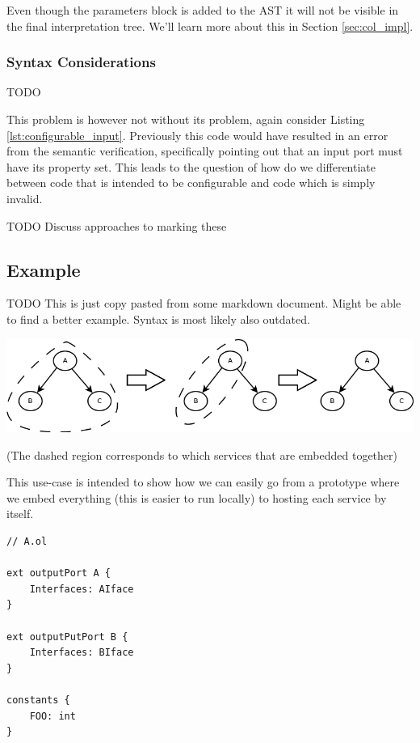 Even though the parameters block is added to the AST it will not be visible in
the final interpretation tree. We'll learn more about this in Section
\ref{sec:col_impl}.

\subsubsection*{Syntax Considerations}

TODO

This problem is however not without its problem, again consider Listing
\ref{lst:configurable_input}. Previously this code would have resulted in an
error from the semantic verification, specifically pointing out that an input
port must have its  property set. This leads to the question
of how do we differentiate between code that is intended to be configurable and
code which is simply invalid.

TODO Discuss approaches to marking these

\subsection{Example}

TODO This is just copy pasted from some markdown document. Might be able to
find a better example. Syntax is most likely also outdated.

\includegraphics[width=\textwidth]{prototypes.png}

(The dashed region corresponds to which services that are embedded together)

This use-case is intended to show how we can easily go from a prototype where
we embed everything (this is easier to run locally) to hosting each service by
itself.

\begin{verbatim}
// A.ol

ext outputPort A {
    Interfaces: AIface
}

ext outputPutPort B {
    Interfaces: BIface
}

constants {
    FOO: int
}
\end{verbatim}

